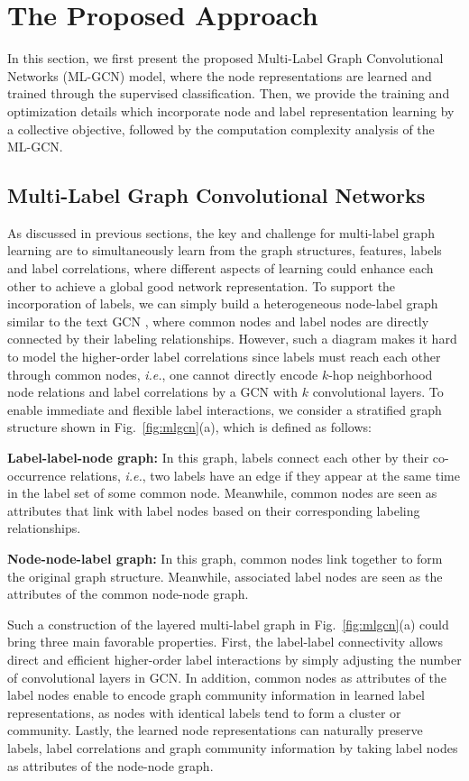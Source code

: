 \documentclass[conference]{IEEEtran}
\begin{document}
\section{The Proposed Approach}
In this section, we first present the proposed Multi-Label Graph Convolutional Networks (ML-GCN) model, where the node representations are learned and trained through the supervised classification. Then, we provide the training and optimization details which incorporate node and label representation learning by a collective objective, followed by the computation complexity analysis of the ML-GCN.
\subsection{Multi-Label Graph Convolutional Networks}
As discussed in previous sections, the key and challenge for multi-label graph learning are to simultaneously learn from the graph structures, features, labels and label correlations, where different aspects of learning could enhance each other to achieve a global good network representation. To support the incorporation of labels, we can simply build a heterogeneous node-label graph similar to the text GCN \cite{25}, where common nodes and label nodes are directly connected by their labeling relationships. However, such a diagram makes it hard to model the higher-order label correlations since labels must reach each other through common nodes, \textit{i.e.}, one cannot directly encode $k$-hop neighborhood node relations and label correlations by a GCN with $k$ convolutional layers. To enable immediate and flexible label interactions, we consider a stratified graph structure shown in Fig.~\ref{fig:mlgcn}(a), which is defined as follows:

\noindent \textbf{Label-label-node graph:} In this graph, labels connect each other by their co-occurrence relations, \textit{i.e.}, two labels have an edge if they appear at the same time in the label set of some common node. Meanwhile, common nodes are seen as attributes that link with label nodes based on their corresponding labeling relationships.

\noindent \textbf{Node-node-label graph:} In this graph, common nodes link together to form the original graph structure. Meanwhile, associated label nodes are seen as the attributes of the common node-node graph.

Such a construction of the layered multi-label graph in Fig.~\ref{fig:mlgcn}(a) could bring three main favorable properties. First, the label-label connectivity allows direct and efficient higher-order label interactions by simply adjusting the number of convolutional layers in GCN. In addition, common nodes as attributes of the label nodes enable to encode graph community information in learned label representations, as nodes with identical labels tend to form a cluster or community. Lastly, the learned node representations can naturally preserve labels, label correlations and graph community information by taking label nodes as attributes of the node-node graph.
\end{document}
